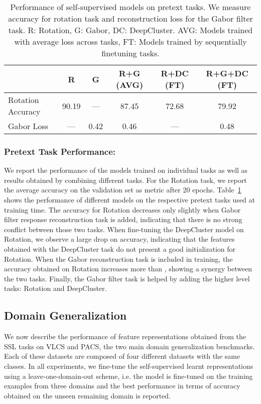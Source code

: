 \documentclass[runningheads]{llncs}
\begin{document}
\begin{table}[t]
\caption{Performance of self-supervised models on pretext tasks. We measure accuracy for rotation task and reconstruction loss for the Gabor filter task. R: Rotation, G: Gabor, DC: DeepCluster. AVG: Models trained with average loss across tasks, FT: Models trained by sequentially finetuning tasks.}
\centering
\begin{tabular}{l|c|c|c|c|c}
\hline
& R & G & R+G (AVG) & R+DC (FT)   & R+G+DC (FT) \\ \hline
Rotation Accuracy & 90.19        & ---   & 87.45    & 72.68   & 79.92   \\
Gabor Loss  &   ---          & 0.42   & 0.46   & ---   & 0.48        \\ \hline
\end{tabular}
\label{tab:pretext}
\end{table}
\vspace{-5pt}\subsubsection{Pretext Task Performance:} We report the performance of the models trained on individual tasks as well as results obtained by combining different tasks. For the Rotation task, we report the average accuracy on the validation set as metric after 20 epochs. 
Table~\ref{tab:pretext} shows the performance of different models on the respective pretext tasks used at training time. The accuracy for Rotation decreases only slightly when  Gabor filter response reconstruction task is added, indicating that there is no strong conflict between those two tasks. When fine-tuning the DeepCluster model on Rotation, we observe a large drop on accuracy, indicating that the features obtained with the DeepCluster task do not present a good initialization for Rotation. When the Gabor reconstruction task is included in training, the accuracy obtained on Rotation increases more than , showing a synergy between the two tasks. Finally, the Gabor filter task is helped by adding the higher level tasks: Rotation and DeepCluster.




\subsection{Domain Generalization}
We now describe the performance of feature representations obtained from the SSL tasks on VLCS and PACS, the two main domain generalization benchmarks. Each of these datasets are composed of four different datasets with the same classes. In all experiments, we fine-tune the self-supervised learnt representations using a leave-one-domain-out scheme, i.e.  the model is fine-tuned on the training examples from three domains and the best performance in terms of accuracy obtained on the unseen remaining domain is reported.
\end{document}
